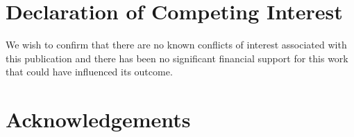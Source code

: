 \documentclass[preprint,12pt, a4paper]{elsarticle}
\begin{document}
\section*{Declaration of Competing Interest}
We wish to confirm that there are no known conflicts of interest associated with this publication and there has been no significant financial support for this work that could have influenced its outcome.


\section*{Acknowledgements}




\end{document}
